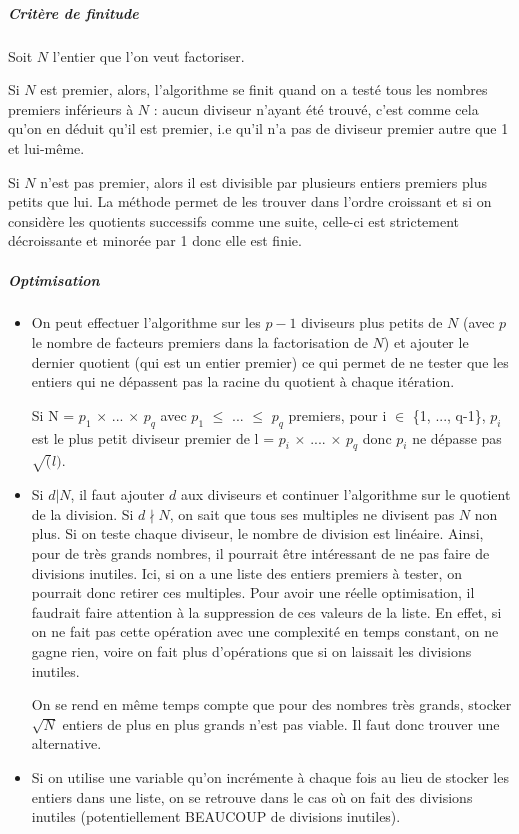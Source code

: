 \documentclass[11pt,a4paper]{article}
\begin{document}
		\subparagraph{Critère de finitude}	
		
		Soit $\mathit{N}$ l'entier que l'on veut factoriser. 
		
		Si $\mathit{N}$ est premier, alors, l'algorithme se finit quand on a testé tous les nombres premiers inférieurs à $\mathit{N}$ : aucun diviseur n'ayant été trouvé, c'est comme cela qu'on en déduit qu'il est premier, i.e qu'il n'a pas de diviseur premier autre que 1 et lui-même. 
		
		Si $\mathit{N}$ n'est pas premier, alors il est divisible par plusieurs entiers premiers plus petits que lui. La méthode permet de les trouver dans l'ordre croissant et si on considère les quotients successifs comme une suite, celle-ci est strictement décroissante et minorée par 1 donc elle est finie.
	
		\subparagraph{Optimisation}
	\begin{itemize}	
		\item On peut effectuer l'algorithme sur les $\mathit{p-1}$ diviseurs plus petits de $\mathit{N}$ (avec $\mathit{p}$ le nombre de facteurs premiers dans la factorisation de $\mathit{N}$) et ajouter le dernier quotient (qui est un entier premier) ce qui permet de ne tester que les entiers qui ne dépassent pas la racine du quotient à chaque itération.
		
		Si N = $p_1$ $\times$ ... $\times$ $p_q$ avec $p_1$ $\leq$ ... $\leq$ $p_q$ premiers, pour i $\in$ \{1, ..., q-1\}, $p_i$ est le plus petit diviseur premier de l = $p_i$ $\times$ .... $\times$ $p_q$ donc $p_i$ ne dépasse pas $\sqrt(l)$.
		
		\item Si $\mathit{d|N}$, il faut ajouter $\mathit{d}$ aux diviseurs et continuer l'algorithme sur le quotient de la division. Si $\mathit{d \nmid N}$, on sait que tous ses multiples ne divisent pas $\mathit{N}$ non plus. Si on teste chaque diviseur, le nombre de division est linéaire. Ainsi, pour de très grands nombres, il pourrait être intéressant de ne pas faire de divisions inutiles. Ici, si on a une liste des entiers premiers à tester, on pourrait donc retirer ces multiples. Pour avoir une réelle optimisation, il faudrait faire attention à la suppression de ces valeurs de la liste. En effet, si on ne fait pas cette opération avec une complexité en temps constant, on ne gagne rien, voire on fait plus d'opérations que si on laissait les divisions inutiles. 
		
		On se rend en même temps compte que pour des nombres très grands, stocker $\sqrt{N}$ entiers de plus en plus grands n'est pas viable. Il faut donc trouver une alternative.
		
		\item Si on utilise une variable qu'on incrémente à chaque fois au lieu de stocker les entiers dans une liste, on se retrouve dans le cas où on fait des divisions inutiles (potentiellement BEAUCOUP de divisions inutiles).
	\end{itemize}
\end{document}
